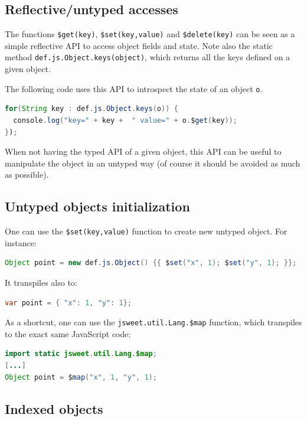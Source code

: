 \documentclass[a4paper]{report}
\begin{document}
\subsection{Reflective/untyped accesses}

The functions \texttt{\$get(key)}, \texttt{\$set(key,value)} and \texttt{\$delete(key)} can be seen as a simple reflective API to access object fields and state. Note also the static method \texttt{def.js.Object.keys(object)}, which returns all the keys defined on a given object. 

The following code uses this API to introspect the state of an object \texttt{o}.

\begin{lstlisting}[language=Java]
for(String key : def.js.Object.keys(o)) {
  console.log("key=" + key +  " value=" + o.$get(key));
});
\end{lstlisting}

When not having the typed API of a given object, this API can be useful to manipulate the object in an untyped way (of course it should be avoided as much as possible).

\subsection{Untyped objects initialization}

One can use the \texttt{\$set(key,value)} function to create new untyped object. For instance:

\begin{lstlisting}[language=Java]
Object point = new def.js.Object() {{ $set("x", 1); $set("y", 1); }};
\end{lstlisting}

It transpiles also to:

\begin{lstlisting}[language=Java]
var point = { "x": 1, "y": 1};
\end{lstlisting}

As a shortcut, one can use the \texttt{jsweet.util.Lang.\$map} function, which transpiles to the exact same JavaScript code:

\begin{lstlisting}[language=Java]
import static jsweet.util.Lang.$map;
[...]
Object point = $map("x", 1, "y", 1);
\end{lstlisting}


\subsection{Indexed objects}
\end{document}
